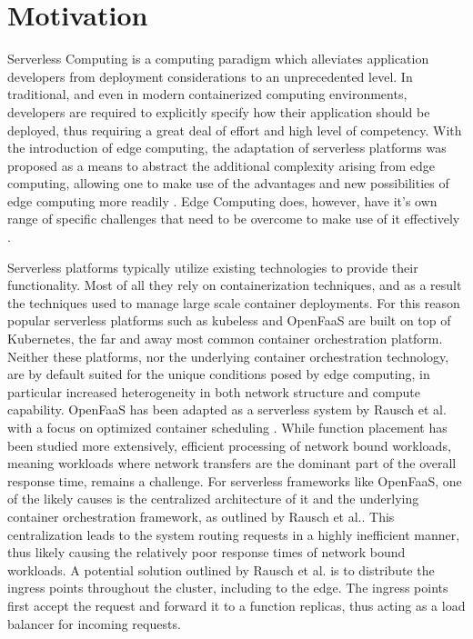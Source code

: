 \section{Motivation}
Serverless Computing is a computing paradigm which alleviates application developers from deployment considerations to an unprecedented level. %
In traditional, and even in modern containerized computing environments, developers are required to explicitly specify how their application should be deployed, thus requiring a great deal of effort and high level of competency. %
With the introduction of edge computing, the adaptation of serverless platforms was proposed as a means to abstract the additional complexity arising from edge computing, allowing one to make use of the advantages and new possibilities of edge computing more readily \cite{nasticServerlessRealTimeData2017}\cite{gliksonDevicelessEdgeComputing2017}.
Edge Computing does, however, have it's own range of specific challenges that need to be overcome to make use of it effectively \cite{shiEdgeComputingVisionChallenges2016}.

Serverless platforms typically utilize existing technologies to provide their functionality. Most of all they rely on containerization techniques, and as a result the techniques used to manage large scale container deployments.
For this reason popular serverless platforms such as kubeless\cite{kubeless} and OpenFaaS\cite{openfaas} are built on top of Kubernetes, the far and away most common container orchestration platform.
Neither these platforms, nor the underlying container orchestration technology, are by default suited for the unique conditions posed by edge computing, in particular increased heterogeneity in both network structure and compute capability.
OpenFaaS has been adapted as a serverless system by Rausch et al. with a focus on optimized container scheduling \cite{skippy}.
While function placement has been studied more extensively, efficient processing of network bound workloads, meaning workloads where network transfers are the dominant part of the overall response time, remains a challenge. For serverless frameworks like OpenFaaS, one of the likely causes is the centralized architecture of it and the underlying container orchestration framework, as outlined by Rausch et al.\cite{skippy}.
This centralization leads to the system routing requests in a highly inefficient manner, thus likely causing the relatively poor response times of network bound workloads. A potential solution outlined by Rausch et al. is to distribute the ingress points throughout the cluster, including to the edge\cite{skippy}.
The ingress points first accept the request and forward it to a function replicas, thus acting as a load balancer for incoming requests.

